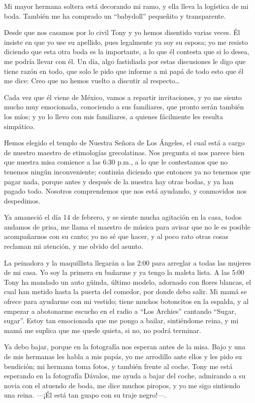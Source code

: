 \documentclass[letterpaper, 12pt]{book}
\begin{document}
Mi mayor hermana soltera está decorando mi ramo, y ella lleva la logística de mi boda. También me ha comprado un ``babydoll'' pequeñito y transparente.

Desde que nos casamos por lo civil Tony y yo hemos disentido varias veces. Él insiste en que yo use su apellido, pues legalmente ya soy su esposa; yo me resisto diciendo que esta otra boda es la importante, a lo que él contesta que si lo desea, me podría llevar con él. Un día, algo fastidiada por estas discusiones le digo que tiene razón en todo, que solo le pido que informe a mi papá de todo esto que él me dice: Creo que no hemos vuelto a discutir al respecto\ldots

Cada vez que él viene de México, vamos a repartir invitaciones, y yo me siento mucho muy emocionada, conociendo a sus familiares, que pronto serán también los míos; y yo lo llevo con mis familiares, a quienes fácilmente les resulta simpático.

Hemos elegido el templo de Nuestra Señora de Los Ángeles, el cual está a cargo de nuestro maestro de etimologías grecolatinas. Nos pregunta si nos parece bien que nuestra misa comience a las 6:30 p.m., a lo que le contestamos que no tenemos ningún inconveniente; continúa diciendo que entonces ya no tenemos que pagar nada, porque antes y después de la nuestra hay otras bodas, y ya han pagado todo. Nosotros comprendemos que nos está ayudando, y conmovidos nos despedimos.

Ya amaneció el día 14 de febrero, y se siente mucha agitación en la casa, todos andamos de prisa, me llama el maestro de música para avisar que no le es posible acompañarnos con su canto; yo no sé que hacer, y al poco rato otras cosas reclaman mi atención, y me olvido del asunto.

La peinadora y la maquillista llegarán a las 2:00 para arreglar a todas las mujeres de mi casa. Yo soy la primera en bañarme y ya tengo la maleta lista.  A las 5:00 Tony ha mandado un auto güinda, último modelo, adornado con flores blancas, el cual han metido hasta la puerta del comedor, por donde debo salir.  Mi mamá se ofrece para ayudarme con mi vestido; tiene muchos botoncitos en la espalda, y al empezar a abotonarme escucho en el radio a ``Los Archies'' cantando ``Sugar, sugar''. Estoy tan emocionada que me pongo a bailar, sintiéndome reina, y mi mamá me suplica que me quede quieta, si no, no podrá terminar.

Ya debo bajar, porque en la fotografía nos esperan antes de la misa. Bajo y una de mis hermanas les habla a mis papás, yo me arrodillo ante ellos y les pido su bendición; mi hermana toma fotos, y también frente al coche. Tony me está esperando en la fotografía Dávalos, me ayuda a bajar del coche, admirando a su novia con el atuendo de boda, me dice muchos piropos, y yo me sigo sintiendo una reina. ---¡Él está tan guapo con su traje negro!---.
\end{document}
